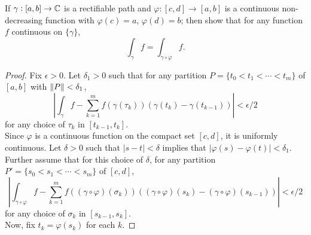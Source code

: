 \documentclass{article}
\begin{document}
\setcounter{exercise}{3}

\begin{exercise}
    If $\gamma:[a,b] \to \mathbb{C}$ is a rectifiable path and $\varphi:[c,d]\to[a,b]$ is a continuous non-decreasing function with $\varphi(c) = a$, $\varphi(d) = b$; then show that for any function $f$ continuous on $\{\gamma\}$,
    \[ \int_\gamma f = \int_{\gamma \circ \varphi} f. \]
\end{exercise}
\begin{proof}
    Fix $\epsilon > 0$. Let $\delta_1 > 0$ such that for any partition $P = \{t_0 < t_1 < \cdots < t_m\}$ of $[a,b]$ with $\left\lVert P\right\rVert < \delta_1$,
    \[ \left| \int_\gamma f - \sum_{k=1}^m f(\gamma(\tau_k)) (\gamma(t_k) - \gamma(t_{k-1})) \right| < \epsilon/2 \]
    for any choice of $\tau_k$ in $[t_{k-1},t_k]$.\\
    Since $\varphi$ is a continuous function on the compact set $[c,d]$, it is uniformly continuous. Let $\delta > 0$ such that $|s-t| < \delta$ implies that $|\varphi(s) - \varphi(t)| < \delta_1$. Further assume that for this choice of $\delta$, for any partition $P' = \{ s_0 < s_1 < \cdots < s_m \}$ of $[c,d]$,
    \[ \left| \int_{\gamma \circ \varphi} f - \sum_{k=1}^m f((\gamma\circ\varphi)(\sigma_k)) ((\gamma\circ\varphi)(s_k) - (\gamma\circ\varphi)(s_{k-1})) \right| < \epsilon/2 \]
    for any choice of $\sigma_k$ in $[s_{k-1},s_k]$.\\
    Now, fix $t_k = \varphi(s_k)$ for each $k$.  
\end{proof}




% 
% 
\end{document}

